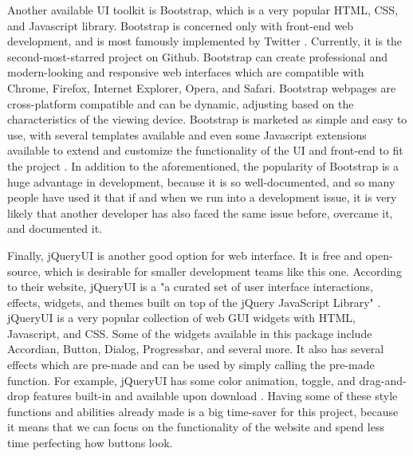 \documentclass[letterpaper, 10pt, draftclsnofoot,onecolumn]{IEEEtran}
\begin{document}
Another available UI toolkit is Bootstrap, which is a very popular HTML, CSS, and Javascript library. Bootstrap is concerned only with front-end web development, and is most famously implemented by Twitter \cite {Bootstrap}. Currently, it is the second-most-starred project on Github. Bootstrap can create professional and modern-looking and responsive web interfaces which are compatible with Chrome, Firefox, Internet Explorer, Opera, and Safari. Bootstrap webpages are cross-platform compatible and can be dynamic, adjusting based on the characteristics of the viewing device. Bootstrap is marketed as simple and easy to use, with several templates available and even some Javascript extensions available to extend and customize the functionality of the UI and front-end to fit the project \cite{Bootstrap}. In addition to the aforementioned, the popularity of Bootstrap is a huge advantage in development, because it is so well-documented, and so many people have used it that if and when we run into a development issue, it is very likely that another developer has also faced the same issue before, overcame it, and documented it.

Finally, jQueryUI is another good option for web interface. It is free and open-source, which is desirable for smaller development teams like this one. According to their website, jQueryUI is a "a curated set of user interface interactions, effects, widgets, and themes built on top of the jQuery JavaScript Library" \cite{jqui}. jQueryUI is a very popular collection of web GUI widgets with HTML, Javascript, and CSS. Some of the widgets available in this package include Accordian, Button, Dialog, Progressbar, and several more. It also has several effects which are pre-made and can be used by simply calling the pre-made function. For example, jQueryUI has some color animation, toggle, and drag-and-drop features built-in and available upon download \cite{jqui}. Having some of these style functions and abilities already made is a big time-saver for this project, because it means that we can focus on the functionality of the website and spend less time perfecting how buttons look.
\end{document}
